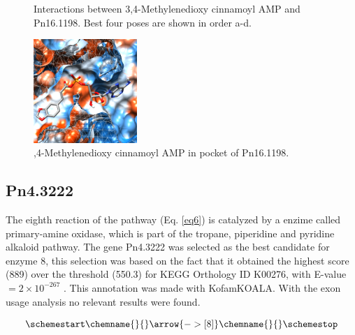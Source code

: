 \documentclass[12pt]{article}
\begin{document}
\begin{figure}[h]
\begin{subfigure}[h!]{0.35\textwidth}
			\caption{}
		\end{subfigure}
		\hfill
		\caption[\centering Interactions between 3,4-Methylenedioxy cinnamoyl AMP and Pn16.1198]{Interactions between 3,4-Methylenedioxy cinnamoyl AMP and Pn16.1198. Best four poses are shown in order a-d.}
		\label{fig6p_3}
	\end{figure}
	\FloatBarrier
	
	
	\FloatBarrier
	\begin{figure}[h!]
		\centering
		\includegraphics[width=0.35\textwidth]{../6/propose/Dock/chimera.png}
		\caption{,4-Methylenedioxy cinnamoyl AMP in pocket of Pn16.1198.}
		\label{fig6p_4}
	\end{figure}
	\FloatBarrier

	\newpage
	
	\subsection{Pn4.3222}
	
	The eighth reaction of the pathway (Eq. \ref{eq6}) is catalyzed by a enzime called primary-amine oxidase, which is part of the tropane, piperidine and pyridine alkaloid pathway. The gene Pn4.3222 was selected as the best candidate for enzyme 8, this selection was based on the fact that it obtained the highest score (889) over the threshold (550.3) for KEGG Orthology ID K00276, with E-value $= 2\times 10^{-267}$ . This annotation was made with KofamKOALA. \cite{kofamkoala} With the exon usage analysis no relevant results were found.
	
	\begin{equation}
	\schemestart
	\chemname{\footnotesize}{\vspace{-50pt}}\arrow{->[ 8]}\chemname{\footnotesize}{\vspace{-50pt}}
	\label{eq6}
	\schemestop
	\end{equation}\\
	
\end{document}
